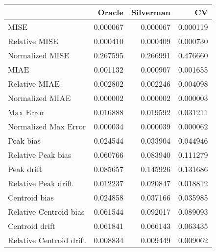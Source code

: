 \begin{tabular}{lrrr}
  \hline
 & Oracle & Silverman & CV \\ 
  \hline
MISE & 0.000067 & 0.000067 & 0.000119 \\ 
  Relative MISE & 0.000410 & 0.000409 & 0.000730 \\ 
  Normalized MISE & 0.267595 & 0.266991 & 0.476660 \\ 
  MIAE & 0.001132 & 0.000907 & 0.001655 \\ 
  Relative MIAE & 0.002802 & 0.002246 & 0.004098 \\ 
  Normalized MIAE & 0.000002 & 0.000002 & 0.000003 \\ 
  Max Error & 0.016888 & 0.019592 & 0.031211 \\ 
  Normalized Max Error & 0.000034 & 0.000039 & 0.000062 \\ 
  Peak bias & 0.024544 & 0.033904 & 0.044946 \\ 
  Relative Peak bias & 0.060766 & 0.083940 & 0.111279 \\ 
  Peak drift & 0.085657 & 0.145926 & 0.131686 \\ 
  Relative Peak drift & 0.012237 & 0.020847 & 0.018812 \\ 
  Centroid bias & 0.024858 & 0.037166 & 0.035985 \\ 
  Relative Centroid bias & 0.061544 & 0.092017 & 0.089093 \\ 
  Centroid drift & 0.061841 & 0.066143 & 0.063435 \\ 
  Relative Centroid drift & 0.008834 & 0.009449 & 0.009062 \\ 
   \hline
\end{tabular}
